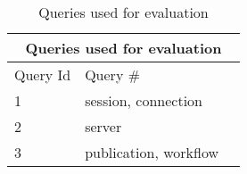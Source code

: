 \begin{table}[H]
\centering
\begin{tabular}{l l  c}
\hline
\multicolumn{3}{c}{Queries used for evaluation}\\
\hline
Query Id & Query \# \\
\hline
1 & session, connection  \\
2 & server  \\
3 & publication, workflow  \\
\hline
\end{tabular}
\caption[Queries used for evaluation]{Queries used for evaluation}
\end{table}
